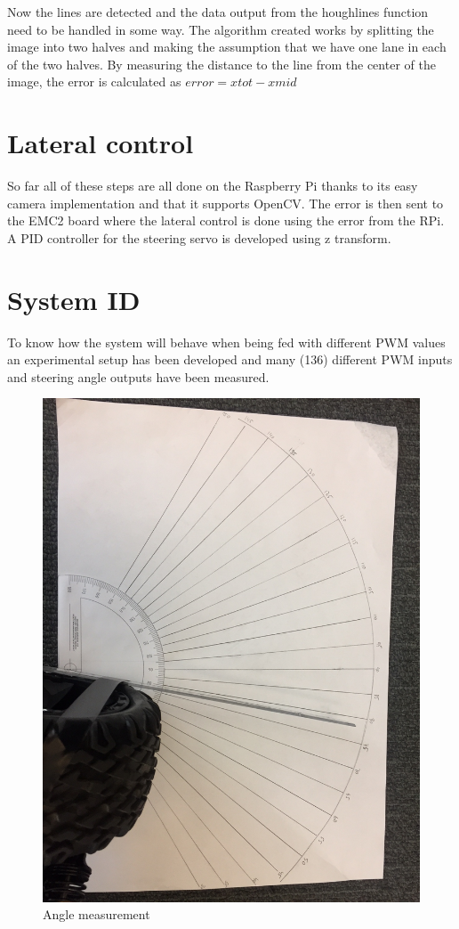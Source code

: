 Now the lines are detected and the data  output from the houghlines function need to be handled in some way. 
The algorithm created works by splitting the image into two halves and making the assumption that we have one lane in each of the two halves. By measuring the distance to the line from the center of the image, the error is calculated as $error = xtot - xmid$





\section{Lateral control}
So far all of these steps are all done on the Raspberry Pi thanks to its easy camera implementation and that it supports OpenCV. The error is then sent to the EMC2 board where the lateral control is done using the error from the RPi. A PID controller for the steering servo is developed using z transform.


\section{System ID}
To know how the system will behave when being fed with different PWM values an experimental setup has been developed and many (136) different PWM inputs and steering angle outputs have been measured.


\begin{figure}[H]
  \includegraphics[width=\textwidth]{./img/anglepic.JPG}
  \centering
  \caption{Angle measurement}
  \label{fig:Angle measurement}
\end{figure}


